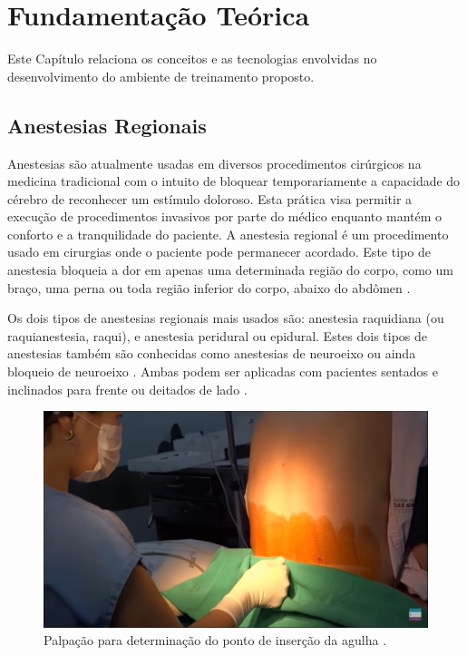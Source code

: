 \chapter{Fundamentação Teórica} \label{cap:cap2}

Este Capítulo relaciona os conceitos e as tecnologias envolvidas no desenvolvimento do ambiente de treinamento proposto. 

\section{Anestesias Regionais}

Anestesias são atualmente usadas em diversos procedimentos cirúrgicos na medicina tradicional com o intuito de bloquear temporariamente a capacidade do cérebro de reconhecer um estímulo doloroso. Esta prática visa permitir a execução de procedimentos invasivos por parte do médico enquanto mantém o conforto e a tranquilidade do paciente. A anestesia regional é um procedimento usado em cirurgias onde o paciente pode permanecer acordado. Este tipo de anestesia bloqueia a dor em apenas uma determinada região do corpo, como um braço, uma perna ou toda região inferior do corpo, abaixo do abdômen \cite{Pinheiro2018}.

Os dois tipos de anestesias regionais mais usados são: anestesia raquidiana (ou raquianestesia, raqui), e anestesia peridural ou epidural. Estes dois tipos de anestesias também são conhecidas como anestesias de neuroeixo ou ainda bloqueio de neuroeixo \cite{Pinheiro2018}. Ambas podem ser aplicadas com pacientes sentados e inclinados para frente ou deitados de lado \cite{Anesclin2019}. 

\begin{figure}[h!]
    \centering
    \includegraphics[scale=0.35,keepaspectratio=true]{figuras/0.marcacaoPonto.png}
    \caption{Palpação para determinação do ponto de inserção da agulha \cite{Londero2018}.}
    \label{fig:marcacaoPonto}
\end{figure}

